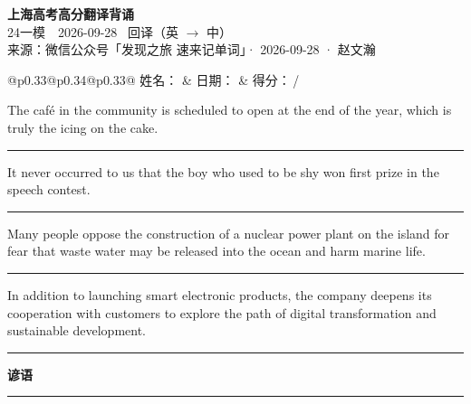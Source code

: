 \documentclass[11pt,a4paper]{article}
\newcommand{\num}[1]{\makebox[1.9em][r]{#1.}\hspace{0.3em}}
\newcommand{\wline}{\noindent\rule{\linewidth}{0.4pt}}
\begin{document}
\pagestyle{plain}
\begin{center}
{\LARGE\bfseries 上海高考高分翻译背诵 }\\[0.25em]
{\large 24一模　2026-09-28 \quad\ 回译（英 $\to$ 中）}\\[0.35em]
{\footnotesize 来源：微信公众号「发现之旅 速来记单词」· 2026-09-28 · 赵文瀚}
\end{center}

\vspace{0.4em}
\noindent\begin{tabular}{@{}p{0.33\textwidth}@{}p{0.34\textwidth}@{}p{0.33\textwidth}@{}}
姓名：\underline{\hspace{2.0cm}} & 日期：\underline{\hspace{2.0cm}} & 得分：\underline{\hspace{1.4cm}}\,/ \\
\end{tabular}

\vspace{0.5em}

\vspace{0.8em}
\num{1}The café in the community is scheduled to open at the end of the year, which is truly the icing on the cake.

\vspace{0.25em}

\wline

\num{2}It never occurred to us that the boy who used to be shy won first prize in the speech contest.

\vspace{0.25em}

\wline

\num{3}Many people oppose the construction of a nuclear power plant on the island for fear that waste water may be released into the ocean and harm marine life.

\vspace{0.25em}

\wline

\num{4}In addition to launching smart electronic products, the company deepens its cooperation with customers to explore the path of digital transformation and sustainable development.

\vspace{0.25em}

\wline

\vspace{0.4em}\noindent{\color{rulegray}\rule{\textwidth}{0.6pt}}\vspace{0.4em}

\num{5}\textbf{谚语}\quad 

\vspace{0.25em}

\wline
\end{document}
